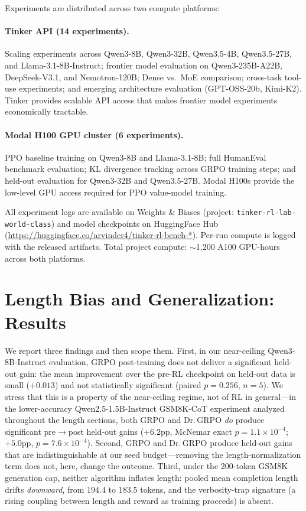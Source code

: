 \documentclass{article}
\begin{document}
Experiments are distributed across two compute platforms:

\paragraph{Tinker API (14 experiments).}
Scaling experiments across Qwen3-8B, Qwen3-32B, Qwen3.5-4B, Qwen3.5-27B,
and Llama-3.1-8B-Instruct; frontier model evaluation on Qwen3-235B-A22B,
DeepSeek-V3.1, and Nemotron-120B; Dense vs.~MoE comparison; cross-task
tool-use experiments; and emerging architecture evaluation (GPT-OSS-20b,
Kimi-K2). Tinker provides scalable API access that makes frontier model
experiments economically tractable.

\paragraph{Modal H100 GPU cluster (6 experiments).}
PPO baseline training on Qwen3-8B and Llama-3.1-8B; full HumanEval
benchmark evaluation; KL divergence tracking across GRPO training steps;
and held-out evaluation for Qwen3-32B and Qwen3.5-27B. Modal H100s
provide the low-level GPU access required for PPO value-model training.

All experiment logs are available on Weights \& Biases (project:
\texttt{tinker-rl-lab-world-class}) and model checkpoints on HuggingFace
Hub (\url{https://huggingface.co/arvindcr4/tinker-rl-bench-*}).
Per-run compute is logged with the released artifacts. Total project compute:
$\sim$1,200 A100 GPU-hours across both platforms.

 \section{Length Bias and Generalization: Results}
\label{sec:p4-results}
We report three findings and then scope them. First, in our near-ceiling
Qwen3-8B-Instruct evaluation, GRPO post-training does not deliver a significant
held-out gain: the mean improvement over the pre-RL checkpoint on held-out data is
small ($+0.013$) and not statistically significant (paired $p=0.256$, $n{=}5$). We
stress that this is a property of the near-ceiling regime, not of RL in general---in
the lower-accuracy Qwen2.5-1.5B-Instruct GSM8K-CoT experiment analyzed throughout
the length sections, both GRPO and Dr.\,GRPO \emph{do} produce significant
pre$\to$post held-out gains ($+6.2$pp, McNemar exact $p=1.1\times10^{-4}$;
$+5.0$pp, $p=7.6\times10^{-4}$). Second, GRPO
and Dr.\,GRPO produce held-out gains that are indistinguishable at our seed
budget---removing the length-normalization term does not, here, change the
outcome. Third, under the 200-token GSM8K generation cap, neither algorithm
inflates length: pooled mean completion length drifts \emph{downward}, from
$194.4$ to $183.5$ tokens, and the verbosity-trap signature (a rising
coupling between length and reward as training proceeds) is absent.
\end{document}
